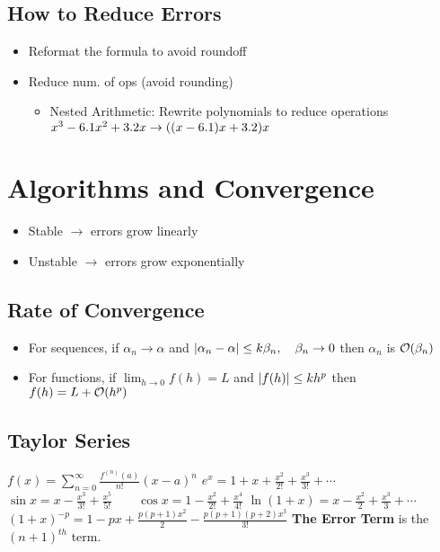 \documentclass[8pt, letterpaper]{extarticle}
\begin{document}
\begin{multicols*}{3}
  \subsection{How to Reduce Errors}
  \begin{itemize}
    \item Reformat the formula to avoid roundoff
    \item Reduce num. of ops (avoid rounding)
      \begin{itemize}
        \item Nested Arithmetic: Rewrite polynomials to reduce operations
          \newline
          $x^3 - 6.1x^2 + 3.2x \to \pqty{\pqty{x-6.1}x + 3.2}x$
      \end{itemize}
  \end{itemize}

  \section{Algorithms and Convergence}
  \begin{itemize}
    \item Stable $\to$ errors grow linearly
    \item Unstable $\to$ errors grow exponentially
  \end{itemize}

  \subsection{Rate of Convergence}
  \begin{itemize}
    \item For sequences, if $\alpha_n \to \alpha$ and $\abs{\alpha_n - \alpha}
      \leq k \beta_n, \quad \beta_n \to 0$ then $\alpha_n$ is $\order{\beta_n}$
    \item For functions, if $\lim_{h \to 0} f(h) = L$ and $\abs{f(h)} \leq kh^p$
      then $f(h) = L + \order{h^p}$
  \end{itemize}

  \subsection{Taylor Series}
  $\displaystyle f(x) = \sum_{n=0}^\infty \frac{f^{(n)}(a)}{n!}(x-a)^n$\newline
  $e^x = 1 + x + \frac{x^2}{2!} + \frac{x^3}{3!} + \dotsb$\newline
  $\sin x = x - \frac{x^3}{3!} + \frac{x^5}{5!}\qquad\cos x = 1 - \frac{x^2}{2!} +
  \frac{x^4}{4!}$\newline
  $\ln (1+x) = x - \frac{x^2}{2} + \frac{x^3}{3} + \dotsb$ \newline %
  $(1+x)^{-p} = 1-px+\frac{p(p+1)x^2}{2} -\frac{p(p+1)(p+2)x^3}{3!}$ %
  \textbf{The Error Term} is the $(n+1)^{th}$ term.


\end{multicols*}
\end{document}
